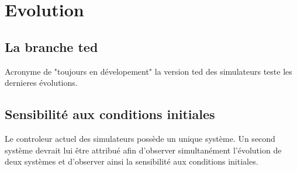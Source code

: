 %
\section{Evolution}
%
%
\subsection{La branche ted}
Acronyme de "toujours en dévelopement" la version ted des simulateurs teste les dernieres évolutions.
%
\subsection{Sensibilité aux conditions initiales}
Le controleur actuel des simulateurs possède un unique système. Un second système devrait lui être attribué afin d'observer simultanément l'évolution de deux systèmes et d'observer ainsi la sensibilité aux conditions initiales.
%
